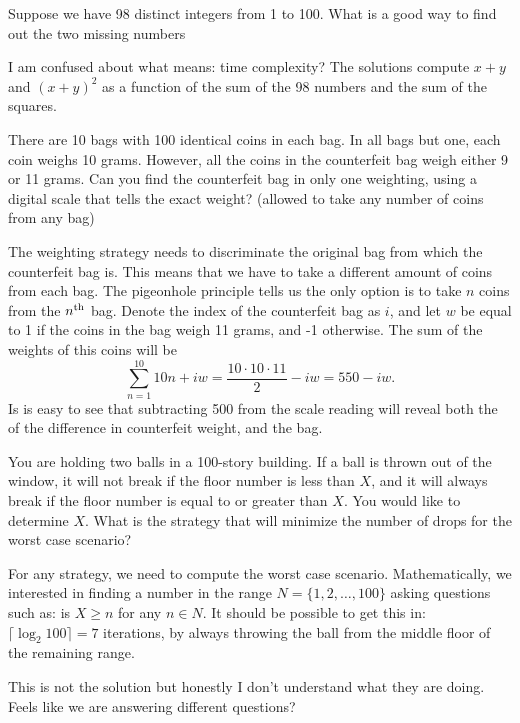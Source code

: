 \begin{qanda} %
    \Q Suppose we have 98 distinct integers from 1 to 100. What is a good way to find out the two missing numbers

    \A I am confused about what  means: time complexity?
    The solutions compute $x+y$ and $(x+y)^2$ as a function of the sum of the 98 numbers and the sum of the squares.
\end{qanda}

\begin{qanda} %

    \Q
    There are 10 bags with 100 identical coins in each bag.
    In all bags but one, each coin weighs 10 grams. 
    However, all the coins in the counterfeit bag weigh either 9 or 11 grams.
    Can you find the counterfeit bag in only one weighting, using a digital scale that tells the exact weight?
    (allowed to take any number of coins from any bag)

    \A
    The weighting strategy needs to discriminate the original bag from which the counterfeit bag is. 
    This means that we have to take a different amount of coins from each bag. The pigeonhole principle tells us the only option is to take $n$ coins from the $n\textsuperscript{th}$ bag.
    Denote the index of the counterfeit bag as $i$, and let $w$ be equal to 1 if the coins in the bag weigh 11 grams, and -1 otherwise.
    The sum of the weights of this coins will be
    \[
        \sum_{n=1}^{10} 10 n + iw  = \frac{10\cdot10\cdot11}{2} - iw = 550 - iw.
    \]
    Is is easy to see that subtracting 500 from the scale reading will reveal both the  of the difference in counterfeit weight, and the bag.
\end{qanda}


\begin{qanda} %
  \Q You are holding two balls in a 100-story building.
  If a ball is thrown out of the window, it will not break if the floor number is less than $X$, and it will always break if the floor number is equal to or greater than $X$.
  You would like to determine $X$.
  What is the strategy that will minimize the number of drops for the worst case scenario?

  \A
  For any strategy, we need to compute the worst case scenario.
  Mathematically, we interested in finding a number in the range $N=\{1, 2, \ldots, 100\}$ asking questions such as: is $X \geq n$ for any $n \in N$.
  It should be possible to get this in: $\lceil \log_2 100 \rceil = 7$ iterations, by always throwing the ball from the middle floor of the remaining range.

  This is not the solution but honestly I don't understand what they are doing. Feels like we are answering different questions? 
\end{qanda}
